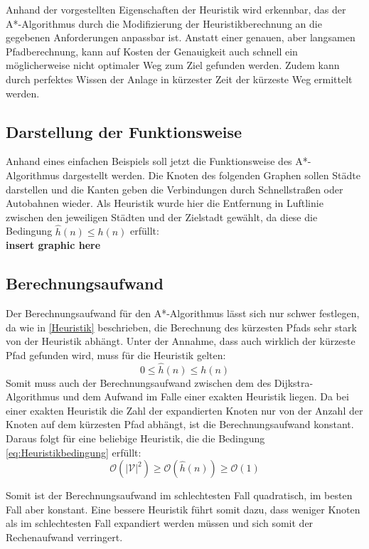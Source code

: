		Anhand der vorgestellten Eigenschaften der Heuristik wird erkennbar, das der A*-Algorithmus durch die Modifizierung der Heuristikberechnung an die gegebenen Anforderungen anpassbar ist. Anstatt einer genauen, aber langsamen Pfadberechnung, kann auf Kosten der Genauigkeit auch schnell ein möglicherweise nicht optimaler Weg zum Ziel gefunden werden. Zudem kann durch perfektes Wissen der Anlage in kürzester Zeit der kürzeste Weg ermittelt werden.
	
	\subsection{Darstellung der Funktionsweise}
		Anhand eines einfachen Beispiels soll jetzt die Funktionsweise des A*-Algorithmus dargestellt werden. Die Knoten des folgenden Graphen sollen Städte darstellen und die Kanten geben die Verbindungen durch Schnellstraßen oder Autobahnen wieder. Als Heuristik wurde hier die Entfernung in Luftlinie zwischen den jeweiligen Städten und der Zielstadt gewählt, da diese die Bedingung $\hat{h}(n)\le h(n)$ erfüllt:
		\\ \textbf{insert graphic here} 

	
	\subsection{Berechnungsaufwand}
		\label{Aufwand_A*}
		Der Berechnungsaufwand für den A*-Algorithmus lässt sich nur schwer festlegen, da wie in \ref{Heuristik} beschrieben, die Berechnung des kürzesten Pfads sehr stark von der Heuristik abhängt. Unter der Annahme, dass auch wirklich der kürzeste Pfad gefunden wird, muss für die Heuristik gelten:
		\begin{equation} \label{eq:Heuristikbedingung}
			0\le \hat{h}(n)\le h(n)
		\end{equation}
		Somit muss auch der Berechnungsaufwand zwischen dem des Dijkstra-Algorithmus und dem Aufwand im Falle einer exakten Heuristik liegen. Da bei einer exakten Heuristik die Zahl der expandierten Knoten nur von der Anzahl der Knoten auf dem kürzesten Pfad abhängt, ist die Berechnungsaufwand konstant. Daraus folgt für eine beliebige Heuristik, die die Bedingung \ref{eq:Heuristikbedingung} erfüllt:
		\begin{equation}
			\mathcal{O}(\lvert \mathcal{V}\rvert ^2)\ge \mathcal{O}(\hat{h}(n))\ge \mathcal{O}(1)
		\end{equation}
		
		Somit ist der Berechnungsaufwand im schlechtesten Fall quadratisch, im besten Fall aber konstant. Eine bessere Heuristik führt somit dazu, dass weniger Knoten als im schlechtesten Fall expandiert werden müssen und sich somit der Rechenaufwand verringert.
		
